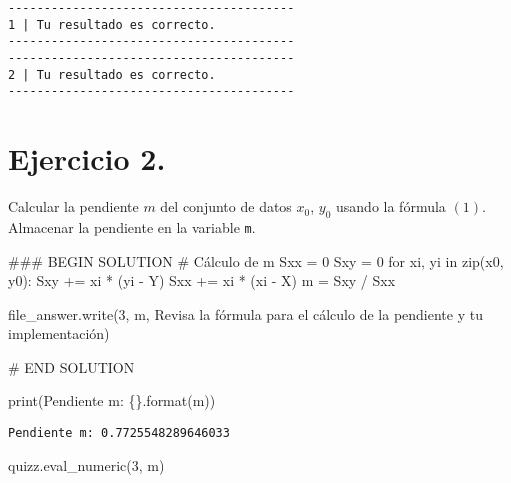 \documentclass[
  letterpaper,
  DIV=11,
  numbers=noendperiod]{scrreprt}
\newenvironment{Shaded}{\begin{snugshade}}{\end{snugshade}}
\newcommand{\BuiltInTok}[1]{\textcolor[rgb]{0.00,0.23,0.31}{#1}}
\newcommand{\CommentTok}[1]{\textcolor[rgb]{0.37,0.37,0.37}{#1}}
\newcommand{\ControlFlowTok}[1]{\textcolor[rgb]{0.00,0.23,0.31}{#1}}
\newcommand{\DecValTok}[1]{\textcolor[rgb]{0.68,0.00,0.00}{#1}}
\newcommand{\KeywordTok}[1]{\textcolor[rgb]{0.00,0.23,0.31}{#1}}
\newcommand{\NormalTok}[1]{\textcolor[rgb]{0.00,0.23,0.31}{#1}}
\newcommand{\OperatorTok}[1]{\textcolor[rgb]{0.37,0.37,0.37}{#1}}
\newcommand{\RegionMarkerTok}[1]{\textcolor[rgb]{0.00,0.23,0.31}{#1}}
\newcommand{\SpecialCharTok}[1]{\textcolor[rgb]{0.37,0.37,0.37}{#1}}
\newcommand{\StringTok}[1]{\textcolor[rgb]{0.13,0.47,0.30}{#1}}
\begin{document}
\begin{verbatim}
----------------------------------------
1 | Tu resultado es correcto.
----------------------------------------
----------------------------------------
2 | Tu resultado es correcto.
----------------------------------------
\end{verbatim}

\section{\texorpdfstring{\textbf{Ejercicio
2.}}{Ejercicio 2.}}\label{ejercicio-2.}

Calcular la pendiente \(m\) del conjunto de datos \(x_0\), \(y_0\)
usando la fórmula \((1)\). Almacenar la pendiente en la variable
\texttt{m}.

\begin{Shaded}
\begin{Highlighting}[]
\CommentTok{\#\#\# }\RegionMarkerTok{BEGIN}\CommentTok{ SOLUTION}
\CommentTok{\# Cálculo de m}
\NormalTok{Sxx }\OperatorTok{=} \DecValTok{0}
\NormalTok{Sxy }\OperatorTok{=} \DecValTok{0}
\ControlFlowTok{for}\NormalTok{ xi, yi }\KeywordTok{in} \BuiltInTok{zip}\NormalTok{(x0, y0):}
\NormalTok{    Sxy }\OperatorTok{+=}\NormalTok{ xi }\OperatorTok{*}\NormalTok{ (yi }\OperatorTok{{-}}\NormalTok{ Y)}
\NormalTok{    Sxx }\OperatorTok{+=}\NormalTok{ xi }\OperatorTok{*}\NormalTok{ (xi }\OperatorTok{{-}}\NormalTok{ X)}
\NormalTok{m }\OperatorTok{=}\NormalTok{ Sxy }\OperatorTok{/}\NormalTok{ Sxx}

\NormalTok{file\_answer.write(}\StringTok{\textquotesingle{}3\textquotesingle{}}\NormalTok{, m, }\StringTok{\textquotesingle{}Revisa la fórmula para el cálculo de la pendiente y tu implementación\textquotesingle{}}\NormalTok{)}

\CommentTok{\# }\RegionMarkerTok{END}\CommentTok{ SOLUTION}

\BuiltInTok{print}\NormalTok{(}\StringTok{\textquotesingle{}Pendiente m: }\SpecialCharTok{\{\}}\StringTok{\textquotesingle{}}\NormalTok{.}\BuiltInTok{format}\NormalTok{(m))}
\end{Highlighting}
\end{Shaded}

\begin{verbatim}
Pendiente m: 0.7725548289646033
\end{verbatim}

\begin{Shaded}
\begin{Highlighting}[]
\NormalTok{quizz.eval\_numeric(}\StringTok{\textquotesingle{}3\textquotesingle{}}\NormalTok{, m)}
\end{Highlighting}
\end{Shaded}
\end{document}
